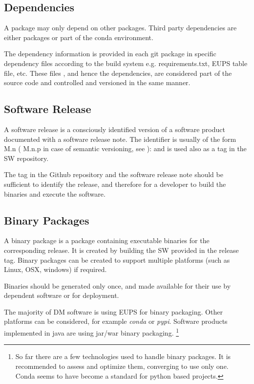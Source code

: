 \subsection{Dependencies} \label{sec:dependencies}


A package may only depend on other packages. Third party dependencies are either packages or part of the conda environment.

The dependency information is provided in each git package in specific dependency files  according to the build system e.g.  requirements.txt, EUPS table file, etc.
These files , and hence the dependencies,  are considered part of the source code and controlled  and versioned in the same manner.


\subsection{Software Release} \label{sec:swrel}

A software release is  a consciously identified version of a  software product
documented with a software release note.
The identifier is usually of the form M.n ( M.n.p in case of semantic versioning, see ): and is used also as a tag in the SW repository.

The tag in the Github repository and the software release note should be sufficient to identify the release, and therefore for a developer
to build the binaries and execute the software.



\subsection{Binary Packages} \label{sec:swbpkg}

A binary package is a package containing executable binaries for the corresponding release.
It is created by building the SW provided in the release tag.
Binary packages can be created to support multiple platforms (such as Linux, OSX, windows) if required.

Binaries should be generated only once, and made available for their use by dependent software or for deployment.

The majority of DM software is using EUPS for binary packaging. Other platforms can be considered, for example \textit{conda} or \textit{pypi}.
Software products implemented in java are using jar/war binary packaging.
\footnote{So far there are a few technologies used to handle binary packages. It is recommended to assess and optimize them, converging to use only one.
Conda seems to have become a standard for python based projects.}

